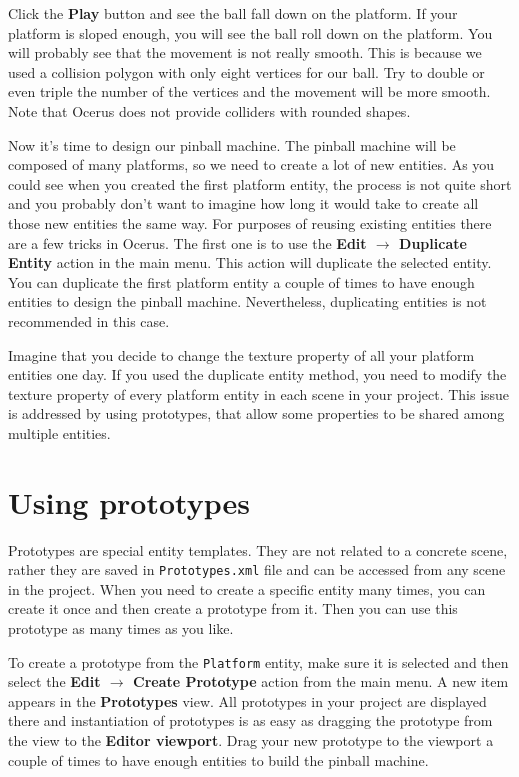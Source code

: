 \documentclass[a4paper,12pt]{article}
\begin{document}
Click the \textbf{Play} button and see the ball fall down on the platform. If your platform is sloped enough, you will see the ball roll down on the platform. You will probably see that the movement is not really smooth. This is because we used a collision polygon with only eight vertices for our ball. Try to double or even triple the number of the vertices and the movement will be more smooth. Note that Ocerus does not provide colliders with rounded shapes.
 
Now it's time to design our pinball machine. The pinball machine will be composed of many platforms, so we need to create a lot of new entities. As you could see when you created the first platform entity, the process is not quite short and you probably don't want to imagine how long it would take to create all those new entities the same way. For purposes of reusing existing entities there are a few tricks in Ocerus. The first one is to use the \textbf{Edit $\to$ Duplicate Entity} action in the main menu. This action will duplicate the selected entity. You can duplicate the first platform entity a couple of times to have enough entities to design the pinball machine. Nevertheless, duplicating entities is not recommended in this case. 

Imagine that you decide to change the texture property of all your platform entities one day. If you used the duplicate entity method, you need to modify the texture property of every platform entity in each scene in your project. This issue is addressed by using prototypes, that allow some properties to be shared among multiple entities.

\section{Using prototypes}
Prototypes are special entity templates. They are not related to a concrete scene, rather they are saved in \texttt{Prototypes.xml} file and can be accessed from any scene in the project. When you need to create a specific entity many times, you can create it once and then create a prototype from it. Then you can use this prototype as many times as you like.

To create a prototype from the \texttt{Platform} entity, make sure it is selected and then select the \textbf{Edit $\to$ Create Prototype} action from the main menu. A new item appears in the \textbf{Prototypes} view. All prototypes in your project are displayed there and instantiation of prototypes is as easy as dragging the prototype from the view to the \textbf{Editor viewport}. Drag your new prototype to the viewport a couple of times to have enough entities to build the pinball machine.
\end{document}

